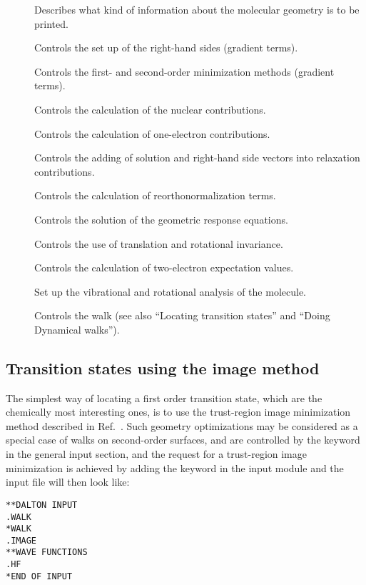 \begin{description}
\item[] Describes what kind  of information about the
molecular geometry is to be printed.
\item[] Controls the set up of the right-hand sides
(gradient terms).
\item[] Controls the first- and second-order
minimization methods
(gradient terms).
\item[] Controls the calculation of the nuclear contributions.
\item[] Controls the calculation of one-electron contributions.
\item[] Controls the adding of solution and right-hand side vectors
into relaxation contributions.
\item[] Controls the calculation of reorthonormalization terms.
\item[] Controls the solution of the geometric response equations.
\item[] Controls the use of translation and rotational invariance.
\item[] Controls the calculation of two-electron
expectation values.
\item[] Set up the vibrational and rotational analysis of the
molecule.
\item[] Controls the walk (see also ``Locating transition
states'' and ``Doing Dynamical walks'').
\end{description}

\subsection{Transition states using the image method}
\label{sec:image}

\begin{center}
\end{center}

 The simplest way of
locating a first order transition state, which are the chemically
most interesting ones, is to use the trust-region
image minimization method
described in Ref.~\cite{thcpl182}. Such geometry optimizations may
be considered as a special case of walks on second-order surfaces,
and are controlled by the keyword  in the general input
section, and the request for a trust-region image minimization is
achieved  by adding the keyword  in the 
input module and the input file will then look like:
\begin{verbatim}
**DALTON INPUT
.WALK
*WALK
.IMAGE
**WAVE FUNCTIONS
.HF
*END OF INPUT
\end{verbatim}


